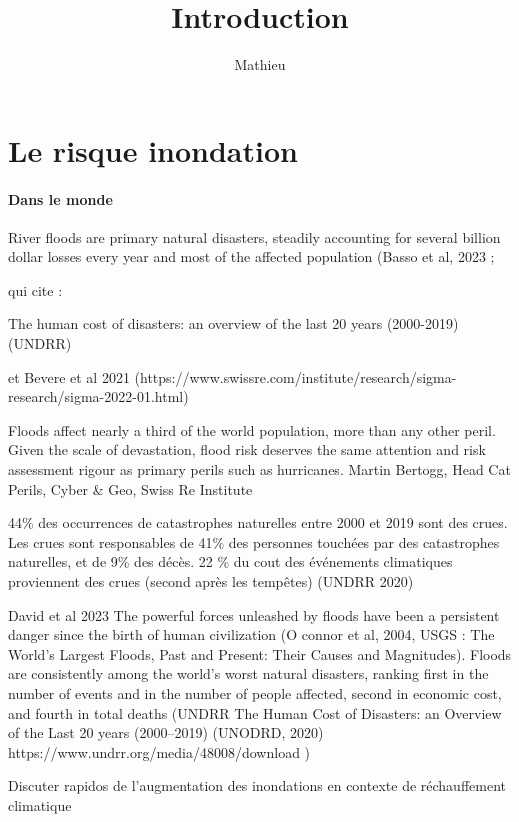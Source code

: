\documentclass[11pt]{article}
\title{Introduction}
\author{Mathieu}
\begin{document}
\maketitle

\tableofcontents

\newpage

\section{Le risque inondation}
	\paragraph{Dans le monde}
	
River floods are primary natural disasters, steadily accounting for several
billion dollar losses every year and most of the affected population (Basso et al, 2023 ; 

qui cite : 

The human cost of disasters: an overview of the last 20 years (2000-2019) (UNDRR)

et Bevere et al 2021 (https://www.swissre.com/institute/research/sigma-research/sigma-2022-01.html)

Floods affect nearly a third of the world population, more than any other peril. Given the scale of devastation, flood risk deserves the same attention and risk assessment rigour as primary perils such as hurricanes.
Martin Bertogg, Head Cat Perils, Cyber & Geo, Swiss Re Institute


44\% des occurrences de catastrophes naturelles entre 2000 et 2019 sont des crues. Les crues sont responsables de 41\% des personnes touchées par des catastrophes naturelles, et de 9\% des décès. 22 \% du cout des événements climatiques proviennent des crues (second après les tempêtes) (UNDRR 2020)


David et al 2023
The powerful forces unleashed by floods have been a persistent danger since the birth of human civilization (O connor et al, 2004, USGS : The World’s Largest Floods, Past and Present: Their Causes and Magnitudes). 
Floods are consistently among the world’s worst natural disasters, ranking first in the number of events and in the number of people affected, second in economic cost, and fourth in total deaths (UNDRR The Human Cost of Disasters: an Overview of the Last 20 years (2000–2019) (UNODRD, 2020) https://www.undrr.org/media/48008/download ) 

Discuter rapidos de l'augmentation des inondations en contexte de réchauffement climatique
\end{document}
